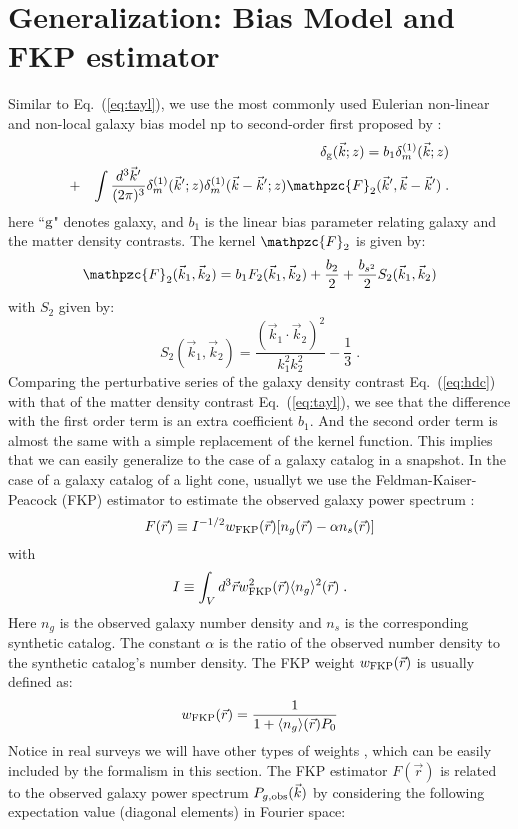 \documentclass[prd,amsmath,amssymb,floatfix,superscriptaddress,nofootinbib,twocolumn]{revtex4-1}
\def\be{\begin{equation}}
\def\ee{\end{equation}}
\def\bea{\begin{eqnarray}}
\def\eea{\end{eqnarray}}
\newcommand{\vk}{\vec{k}}
\newcommand{\ec}[1]{Eq.~(\ref{eq:#1})}
\newcommand{\eql}[1]{\label{eq:#1}}
\begin{document}
\section{Generalization: Bias Model and FKP estimator} \label{sec3}
Similar to \ec{tayl}, we use the most commonly used Eulerian non-linear and non-local galaxy bias model np to second-order first proposed by \cite{McDonald:2009dh}:
\bea 
&&\delta_{\rm g}(\vec{k};z) = b_1\delta^{(1)}_m (\vec{k};z)\nonumber \\
&+&\int \frac{d^{3}\vec{k}'}{(2\pi)^3}\delta^{(1)}_{m}(\vec{k}';z)\delta^{(1)}_{m}(\vec{k}-\vec{k}';z)\mathpzc{F}_{2}(\vec{k}',\vec{k}-\vec{k}') \;. \eql{hdc}
\eea 
here ``$\rm g$" denotes galaxy, and $b_{1}$ is the linear bias parameter relating galaxy and the matter density contrasts. The kernel $\mathpzc{F}_2$ is given by:
\be 
\mathpzc{F}_2(\vk_1,\vk_2)=b_1F_{2}(\vk_1,\vk_2)+\frac{b_2}{2}+\frac{b_{s^2}}{2}S_{2}(\vk_1,\vk_2)
\ee
with $S_2$ given by:
\be 
S_{2}(\vk_1,\vk_2)=\frac{(\vk_1\cdot \vk_2)^2}{k_1^2k_2^2}-\frac{1}{3}\;.
\ee 
Comparing the perturbative series of the galaxy density contrast \ec{hdc} with that of the matter density contrast \ec{tayl}, we see that the difference with the first order term is an extra coefficient $b_1$. And the second order term is almost the same with a simple replacement of the kernel function. This implies that we can easily generalize to the case of a galaxy catalog in a snapshot. In the case of a galaxy catalog of a light cone, usuallyt we use the Feldman-Kaiser-Peacock (FKP) estimator to estimate the observed galaxy power spectrum \cite{Feldman:1993ky}:
\be
F(\vec{r})\equiv I^{-1/2}w_{\rm FKP}(\vec{r})[n_{g}(\vec{r})-\alpha n_{s}(\vec{r})]
\ee
with
\be
I\equiv\int_{V} d^{3}\vec{r}w_{\rm FKP}^{2}(\vec{r})\langle n_{ g}\rangle^{2}(\vec{r})\;.
\ee
Here $n_{g}$ is the observed galaxy number density and $n_{s}$ is the corresponding synthetic catalog. The constant $\alpha$ is the ratio of the observed number density to the synthetic catalog's number density. The FKP weight $w_{\rm FKP}(\vec{r})$ is usually defined as:
\begin{eqnarray}
w_{\rm FKP}(\vec{r})=\frac{1}{1+\langle n_{g}\rangle (\vec{r})P_{0}}
\end{eqnarray}
Notice in real surveys we will have other types of weights \cite{Gil-Marin:2014sta}\cite{Gil-Marin:2018cgo}, which can be easily included by the formalism in this section. The FKP estimator $F(\vec{r})$ is related to the observed galaxy power spectrum $P_{g,\rm obs}(\vec{k})$ by considering the following expectation value (diagonal elements) in Fourier space:
\end{document}
